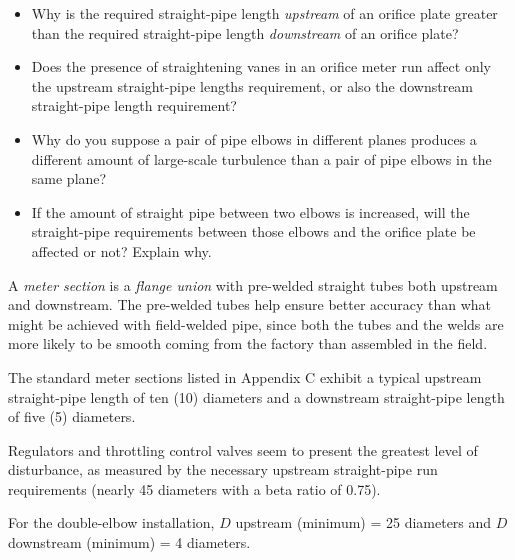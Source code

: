 \begin{itemize}
\item{} Why is the required straight-pipe length {\it upstream} of an orifice plate greater than the required straight-pipe length {\it downstream} of an orifice plate?
\item{} Does the presence of straightening vanes in an orifice meter run affect only the upstream straight-pipe lengths requirement, or also the downstream straight-pipe length requirement?
\item{} Why do you suppose a pair of pipe elbows in different planes produces a different amount of large-scale turbulence than a pair of pipe elbows in the same plane?
\item{} If the amount of straight pipe between two elbows is increased, will the straight-pipe requirements between those elbows and the orifice plate be affected or not?  Explain why.
\end{itemize}














A {\it meter section} is a {\it flange union} with pre-welded straight tubes both upstream and downstream.  The pre-welded tubes help ensure better accuracy than what might be achieved with field-welded pipe, since both the tubes and the welds are more likely to be smooth coming from the factory than assembled in the field.

\vskip 10pt

The standard meter sections listed in Appendix C exhibit a typical upstream straight-pipe length of ten (10) diameters and a downstream straight-pipe length of five (5) diameters.

\vskip 10pt

Regulators and throttling control valves seem to present the greatest level of disturbance, as measured by the necessary upstream straight-pipe run requirements (nearly 45 diameters with a beta ratio of 0.75).

\vskip 10pt

For the double-elbow installation, $D$ upstream (minimum) = 25 diameters and $D$ downstream (minimum) = 4 diameters.









